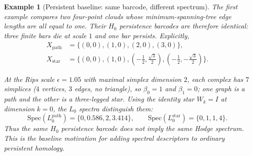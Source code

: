 \documentclass[11pt]{amsart}
\theoremstyle{plain}
\newtheorem{example}[theorem]{Example}
\begin{document}
\begin{example}[Persistent baseline: same barcode, different spectrum]
The first example compares two four-point clouds whose minimum-spanning-tree edge lengths are all
equal to one. Their $H_0$ persistence barcodes are therefore identical: three finite bars die at
scale $1$ and one bar persists. Explicitly,
\[
\begin{aligned}
X_{\mathrm{path}}&=\{(0,0),(1,0),(2,0),(3,0)\},\\
X_{\mathrm{star}}&=\{(0,0),(1,0),(-\tfrac12,\tfrac{\sqrt3}{2}),
(-\tfrac12,-\tfrac{\sqrt3}{2})\}.
\end{aligned}
\]
\begin{center}
\end{center}
At the Rips scale $\epsilon=1.05$ with maximal simplex dimension $2$, each complex has $7$ simplices
($4$ vertices, $3$ edges, no triangle), so $\beta_0=1$ and $\beta_1=0$; one graph is a path and the
other is a three-legged star. Using the identity star $W_k=I$ at dimension $k=0$, the $L_0$ spectra
distinguish them:
\[
\mathrm{Spec}(L_0^{\mathrm{path}})
=
\{0,0.586,2,3.414\},
\qquad
\mathrm{Spec}(L_0^{\mathrm{star}})
=
\{0,1,1,4\}.
\]
Thus the same $H_0$ persistence barcode does not imply the same Hodge spectrum. This is the
baseline motivation for adding spectral descriptors to ordinary persistent homology.
\end{example}
\end{document}
